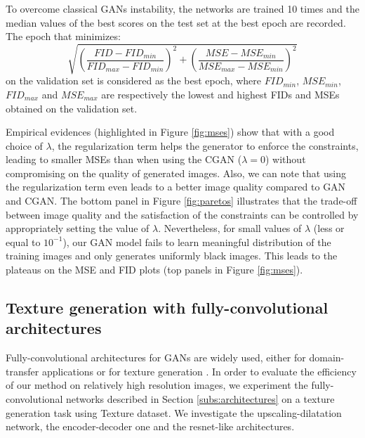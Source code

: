 To overcome classical GANs instability, the networks are trained 10 times and the median values of the best scores on the test set at the best epoch 
are recorded. The epoch that minimizes:
\begin{equation*}
\sqrt{\left(\frac{FID - FID_{min}}{FID_{max}- FID_{min}}\right)^2 + \left(\frac{MSE - MSE_{min}}{MSE_{max}- MSE_{min}}\right)^2}
\end{equation*}  on the validation set is considered as the best epoch, where $FID_{min}$, $MSE_{min}$, $FID_{max}$ and $MSE_{max}$ are respectively the lowest and highest FIDs and MSEs obtained on the validation set.

Empirical evidences (highlighted in Figure \ref{fig:mses}) show that with a good choice of $\lambda$, the regularization term helps the generator to enforce the constraints, leading to smaller MSEs than when using the CGAN ($\lambda=0$) without compromising on the quality of generated images. Also, we can note that using the regularization term even leads to a better image quality compared to GAN and CGAN.
%
The bottom panel in Figure \ref{fig:paretos} illustrates that the trade-off between image quality and the satisfaction of the constraints can be controlled by appropriately setting the value of $\lambda$. Nevertheless, for small values of $\lambda$ (less or equal to $10^{-1}$), our GAN model fails to learn meaningful distribution of the training images and only generates uniformly black images. This leads to the plateaus on the MSE and FID plots (top panels in Figure \ref{fig:mses}).



\subsection{Texture generation with fully-convolutional architectures}
\label{sub:fcnn}
Fully-convolutional architectures for GANs are widely used, either for domain-transfer applications \citep{Zhu2017}\citep{Isola2016} or for texture generation \citep{Jetchev2017}. In order to evaluate the efficiency of our method on relatively high resolution images, we experiment the fully-convolutional networks described in Section \ref{subs:architectures} on a texture generation task using Texture dataset. We investigate the upscaling-dilatation network, the encoder-decoder one and the resnet-like architectures.


